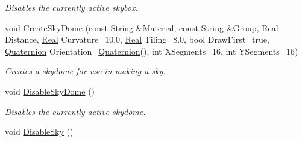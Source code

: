 \begin{DoxyCompactItemize}
\begin{DoxyCompactList}\small\item\em Disables the currently active skybox. \item\end{DoxyCompactList}\item 
void \hyperlink{classphys_1_1SceneManager_a965bec06f491a619101c3142ca1eb47c}{CreateSkyDome} (const \hyperlink{namespacephys_aa03900411993de7fbfec4789bc1d392e}{String} \&Material, const \hyperlink{namespacephys_aa03900411993de7fbfec4789bc1d392e}{String} \&Group, \hyperlink{namespacephys_af7eb897198d265b8e868f45240230d5f}{Real} Distance, \hyperlink{namespacephys_af7eb897198d265b8e868f45240230d5f}{Real} Curvature=10.0, \hyperlink{namespacephys_af7eb897198d265b8e868f45240230d5f}{Real} Tiling=8.0, bool DrawFirst=true, \hyperlink{classphys_1_1Quaternion}{Quaternion} Orientation=\hyperlink{classphys_1_1Quaternion}{Quaternion}(), int XSegments=16, int YSegments=16)
\begin{DoxyCompactList}\small\item\em Creates a skydome for use in making a sky. \item\end{DoxyCompactList}\item 
void \hyperlink{classphys_1_1SceneManager_a11bf15ca8c7d758ee50e423ad03d2625}{DisableSkyDome} ()
\begin{DoxyCompactList}\small\item\em Disables the currently active skydome. \item\end{DoxyCompactList}\item 
\hypertarget{classphys_1_1SceneManager_a929da26f1fcdbe98484b7162dcf2d16f}{
void \hyperlink{classphys_1_1SceneManager_a929da26f1fcdbe98484b7162dcf2d16f}{DisableSky} ()}
\label{dd/da8/classphys_1_1SceneManager_a929da26f1fcdbe98484b7162dcf2d16f}


\end{DoxyCompactItemize}

